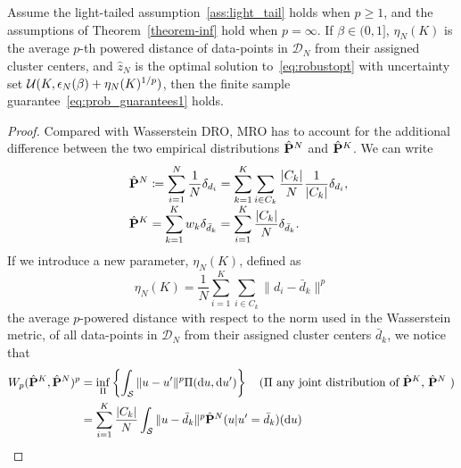 {\begin{theorem} \label{theorem_mro} Assume the light-tailed assumption~\ref{ass:light_tail} holds when $p \geq 1$, and the assumptions of Theorem~\ref{theorem-inf} hold when $p = \infty$. If ${\beta \in (0,1]}$, $\eta_N(K)$ is the average $p$-th powered distance of data-points in $\mathcal{D}_N$ from their assigned cluster centers, and $\hat{z}_N$ is the optimal solution to~\eqref{eq:robustopt} with uncertainty set ${\mathcal{U}}(K,\epsilon_N(\beta) + \eta_N(K)^{1/p})$, then the finite sample guarantee~\eqref{eq:prob_guarantees1} holds.
\end{theorem}

\begin{proof}
Compared with Wasserstein \gls{DRO}, \gls{MRO} has to account for the additional difference between the two empirical distributions $\hat{{\mathbf P}}^N$ and $\hat{{\mathbf P}}^K$.
We can write
\begin{equation*}
	\begin{array}{ll}
		&\displaystyle \hat{\prob}^N \define \sum_{i=1}^N \frac{1}{N}\delta_{d_i} = \sum_{k=1}^K \sum_{i \in C_k} \frac{|C_k|}{N}\frac{1}{|C_k|}   \delta_{d_i}, \\ %
		&\displaystyle \hat{\prob}^K = \sum_{k=1}^K w_k\delta_{\bar{d}_k} = \sum_{i=1}^K \frac{|C_k|}{N}\delta_{\bar{d}_k}. %
		\end{array}
	\end{equation*}
If we introduce a new parameter, $\eta_N(K)$, defined as
\begin{equation*}
	\eta_N(K) =  \frac{1}{N} \sum_{i = 1}^K \sum_{i \in C_k} \|d_i - \bar{d}_k\|^p
	\end{equation*}
	 the average $p$-powered distance with respect to the norm used in the Wasserstein metric, of all data-points in $\mathcal{D}_N$ from their assigned cluster centers $\bar{d}_k$, we notice that
\begin{equation*}
	\begin{aligned}
	W_p(\hat{\prob}^K,\hat{\prob}^N)^p &= \inf_\Pi \left\{ \int_\reviewChanges{\supp} \|u - u'\|^p \Pi (\dif u,\dif u') \right\} \quad \text{($\Pi$ any joint distribution of $\hat{\prob}^K$, $\hat{\prob}^N$  )}\\
&=\sum_{i = 1}^K \frac{|C_k|}{N}  \int_\reviewChanges{\supp} \|u - \bar{d}_k\|^p \reviewChanges{\hat{\prob}^N(u|u' =\bar{d}_k)}({\rm d}u)\\

\end{aligned}
\end{equation*}
\end{proof}}

